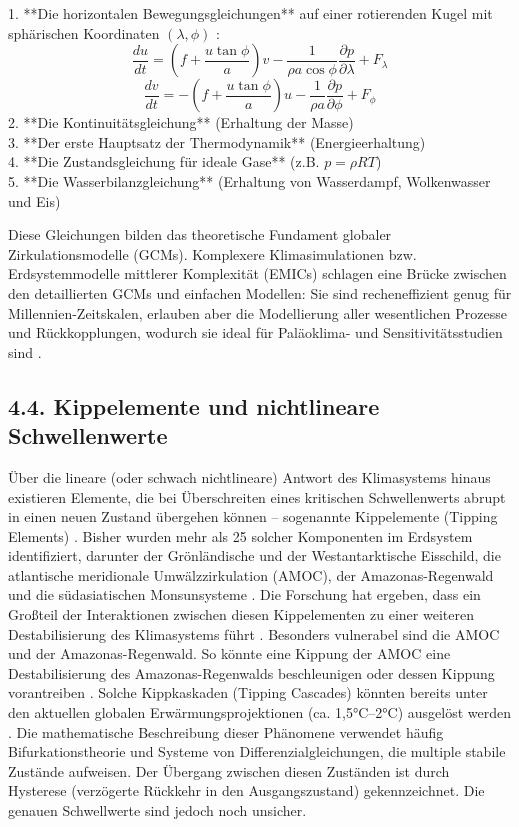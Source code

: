 \documentclass[12pt, a4paper]{article}
\begin{document}
	1. **Die horizontalen Bewegungsgleichungen** auf einer rotierenden Kugel mit sphärischen
	Koordinaten \((\lambda, \phi)\) \cite{ictp2001}:
	\[
	\frac{du}{dt} = \left(f + \frac{u \tan \phi}{a}\right)v - \frac{1}{\rho a \cos \phi} \frac{\partial p}{\partial \lambda} + F_\lambda
	\]
	\[
	\frac{dv}{dt} = -\left(f + \frac{u \tan \phi}{a}\right)u - \frac{1}{\rho a} \frac{\partial p}{\partial \phi} + F_\phi
	\]
	2. **Die Kontinuitätsgleichung** (Erhaltung der Masse) \\
	3. **Der erste Hauptsatz der Thermodynamik** (Energieerhaltung) \\
	4. **Die Zustandsgleichung für ideale Gase** (z.B. \(p = \rho R T\)) \\
	5. **Die Wasserbilanzgleichung** (Erhaltung von Wasserdampf, Wolkenwasser und Eis)
	
	Diese Gleichungen bilden das theoretische Fundament globaler Zirkulationsmodelle (GCMs). Komplexere Klimasimulationen bzw. Erdsystemmodelle mittlerer Komplexität (EMICs) schlagen eine Brücke zwischen den detaillierten GCMs und einfachen Modellen: Sie sind recheneffizient genug für Millennien-Zeitskalen, erlauben aber die Modellierung aller wesentlichen Prozesse und Rückkopplungen, wodurch sie ideal für Paläoklima- und Sensitivitätsstudien sind \cite{gmd2018}.
	
	\subsection*{4.4. Kippelemente und nichtlineare Schwellenwerte}
	Über die lineare (oder schwach nichtlineare) Antwort des Klimasystems hinaus existieren Elemente, die bei Überschreiten eines kritischen Schwellenwerts abrupt in einen neuen Zustand übergehen können – sogenannte Kippelemente (Tipping Elements) \cite{carbonbrief2025}.
	Bisher wurden mehr als 25 solcher Komponenten im Erdsystem identifiziert, darunter der Grönländische und der Westantarktische Eisschild, die atlantische meridionale Umwälzzirkulation (AMOC), der Amazonas-Regenwald und die südasiatischen Monsunsysteme \cite{carbonbrief2025, wunderling2022}.
	Die Forschung hat ergeben, dass ein Großteil der Interaktionen zwischen diesen Kippelementen zu einer weiteren Destabilisierung des Klimasystems führt \cite{carbonbrief2025}.
	Besonders vulnerabel sind die AMOC und der Amazonas-Regenwald. So könnte eine Kippung der AMOC eine Destabilisierung des Amazonas-Regenwalds beschleunigen oder dessen Kippung vorantreiben \cite{carbonbrief2025}.
	Solche Kippkaskaden (Tipping Cascades) könnten bereits unter den aktuellen globalen Erwärmungsprojektionen (ca. 1,5°C–2°C) ausgelöst werden \cite{carbonbrief2025, wunderling2022}.
	Die mathematische Beschreibung dieser Phänomene verwendet häufig Bifurkationstheorie und Systeme von Differenzialgleichungen, die multiple stabile Zustände aufweisen.
	Der Übergang zwischen diesen Zuständen ist durch Hysterese (verzögerte Rückkehr in den Ausgangszustand) gekennzeichnet.
	Die genauen Schwellwerte sind jedoch noch unsicher.
	
\end{document}
